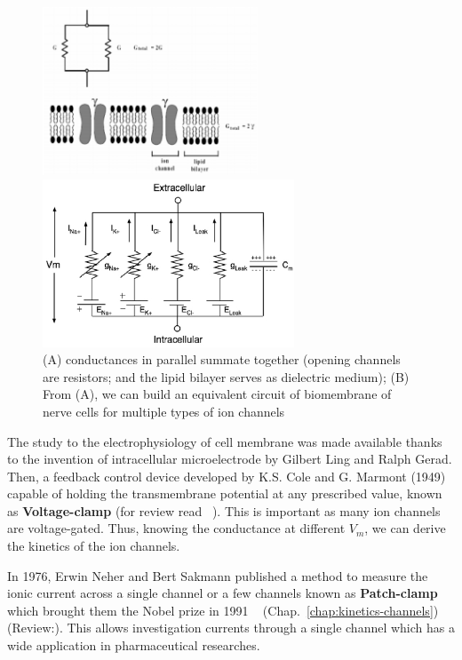\begin{figure}[htb]
  \centerline{\includegraphics[height=5cm]{./images/conductance-ionchannels-membrane.eps}}
  \centerline{\includegraphics[height=5cm]{./images/MembraneCircuit.eps}}
  \caption{(A) conductances in parallel summate together (opening
  channels are resistors; and the lipid bilayer serves as dielectric medium);
  (B) From (A), we can build an equivalent circuit of biomembrane of nerve
  cells for multiple types of ion channels}\label{fig:membrane-circuit}
\end{figure}

The study to the electrophysiology of cell membrane was made available thanks to
the invention of intracellular microelectrode by Gilbert Ling and Ralph Gerad.
Then, a feedback control device developed by K.S. Cole and G. Marmont (1949)
capable of holding the transmembrane potential at any prescribed value, known as
{\bf Voltage-clamp} \citep{cole1949,marmont1949} (for review read
~\citep{halliwell1994vct}). This is important as many ion channels are
voltage-gated. Thus, knowing the conductance at different $V_m$, we can derive
the kinetics of the ion channels.


In 1976, Erwin Neher and Bert Sakmann published a method to measure the ionic
current across a single channel or a few channels known as {\bf Patch-clamp}
which brought them the Nobel prize in 1991
~\citep{fishmann1975pvc, hamill1981, ogden1981, halliwell1994vct}
(Chap.~\ref{chap:kinetics-channels}) (Review:\citep{verkhratsky2006}). This
allows investigation currents through a single channel which has a wide
application in pharmaceutical researches. 

